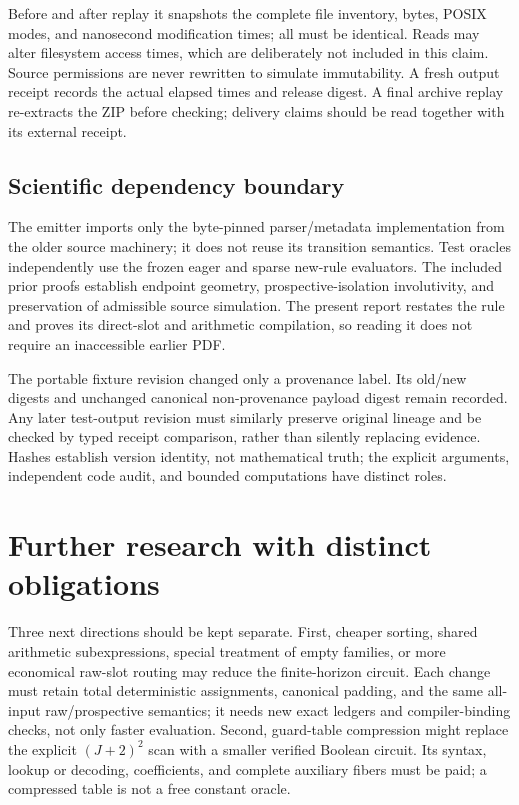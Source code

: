 \documentclass[11pt,a4paper]{article}
\numberwithin{equation}{section}
\begin{document}
Before and after replay it snapshots the complete file inventory, bytes, POSIX modes, and nanosecond modification times; all must be identical. Reads may alter filesystem access times, which are deliberately not included in this claim. Source permissions are never rewritten to simulate immutability. A fresh output receipt records the actual elapsed times and release digest. A final archive replay re-extracts the ZIP before checking; delivery claims should be read together with its external receipt.

\subsection{Scientific dependency boundary}
The emitter imports only the byte-pinned parser/metadata implementation from the older source machinery; it does not reuse its transition semantics. Test oracles independently use the frozen eager and sparse new-rule evaluators. The included prior proofs establish endpoint geometry, prospective-isolation involutivity, and preservation of admissible source simulation. The present report restates the rule and proves its direct-slot and arithmetic compilation, so reading it does not require an inaccessible earlier PDF.

The portable fixture revision changed only a provenance label. Its old/new digests and unchanged canonical non-provenance payload digest remain recorded. Any later test-output revision must similarly preserve original lineage and be checked by typed receipt comparison, rather than silently replacing evidence. Hashes establish version identity, not mathematical truth; the explicit arguments, independent code audit, and bounded computations have distinct roles.

\section{Further research with distinct obligations}
Three next directions should be kept separate. First, cheaper sorting, shared arithmetic subexpressions, special treatment of empty families, or more economical raw-slot routing may reduce the finite-horizon circuit. Each change must retain total deterministic assignments, canonical padding, and the same all-input raw/prospective semantics; it needs new exact ledgers and compiler-binding checks, not only faster evaluation. Second, guard-table compression might replace the explicit $(J+2)^2$ scan with a smaller verified Boolean circuit. Its syntax, lookup or decoding, coefficients, and complete auxiliary fibers must be paid; a compressed table is not a free constant oracle.
\end{document}
